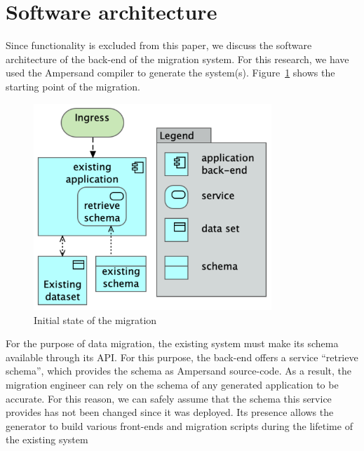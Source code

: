 \documentclass{elsarticle}
\begin{document}
\section{Software architecture}
   Since functionality is excluded from this paper, we discuss the software architecture of the back-end of the migration system.
   For this research, we have used the Ampersand compiler to generate the system(s).
   Figure~\ref{fig:initial} shows the starting point of the migration.
\begin{figure}
   \centering
   \includegraphics[width=0.8\textwidth]{figures/Before migration.png}
   \caption{Initial state of the migration}
   \label{fig:initial}
\end{figure}
   For the purpose of data migration, the existing system must make its schema available through its API.
   For this purpose, the back-end offers a service ``retrieve schema'', which provides the schema as Ampersand source-code.
   As a result, the migration engineer can rely on the schema of any generated application to be accurate.
   For this reason, we can safely assume that the schema this service provides has not been changed since it was deployed.
   Its presence allows the generator to build various front-ends and migration scripts during the lifetime of the existing system%
\end{document}
